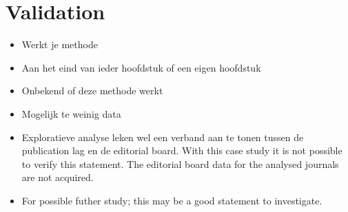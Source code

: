 \documentclass{ou-report}
\newcommand{\outline}[1]{{\color{blue} #1}}
\begin{document}
\section{Validation}
\outline{
\begin{itemize}
    \item Werkt je methode
    \item Aan het eind van ieder hoofdstuk of een eigen hoofdstuk
\end{itemize}
}
\begin{itemize}
    \item Onbekend of deze methode werkt
    \item Mogelijk te weinig data
    \item Exploratieve analyse leken wel een verband aan te tonen tussen de
    publication lag en de editorial board. With this case study it is not 
    possible to verify this statement. The editorial board data for the analysed
    journals are not acquired. 
    \item For possible futher study; this may be a good statement to 
    investigate.
\end{itemize}




\end{document}
